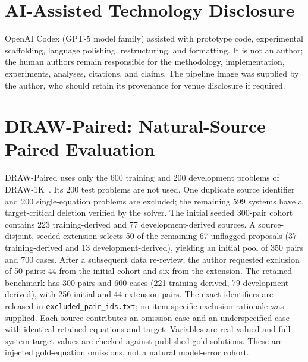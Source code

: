 \documentclass[10pt]{article}
\newcommand{\code}[1]{{\footnotesize\nolinkurl{#1}}}
\begin{document}
\section{AI-Assisted Technology Disclosure}
\enlargethispage{2\baselineskip}
OpenAI Codex (GPT-5 model family) assisted with prototype code, experimental scaffolding, language polishing, restructuring, and formatting. It is not an author; the human authors remain responsible for the methodology, implementation, experiments, analyses, citations, and claims. The pipeline image was supplied by the author, who should retain its provenance for venue disclosure if required.

\section{DRAW-Paired: Natural-Source Paired Evaluation}
DRAW-Paired uses only the 600 training and 200 development problems of DRAW-1K~\cite{upadhyay2017derivations}. Its 200 test problems are not used. One duplicate source identifier and 200 single-equation problems are excluded; the remaining 599 systems have a target-critical deletion verified by the solver. The initial seeded 300-pair cohort contains 223 training-derived and 77 development-derived sources. A source-disjoint, seeded extension selects 50 of the remaining 67 unflagged proposals (37 training-derived and 13 development-derived), yielding an initial pool of 350 pairs and 700 cases. After a subsequent data re-review, the author requested exclusion of 50 pairs: 44 from the initial cohort and six from the extension. The retained benchmark has 300 pairs and 600 cases (221 training-derived, 79 development-derived), with 256 initial and 44 extension pairs. The exact identifiers are released in \code{excluded\_pair\_ids.txt}; no item-specific exclusion rationale was supplied. Each source contributes an omission case and an underspecified case with identical retained equations and target. Variables are real-valued and full-system target values are checked against published gold solutions. These are injected gold-equation omissions, not a natural model-error cohort.
\end{document}
